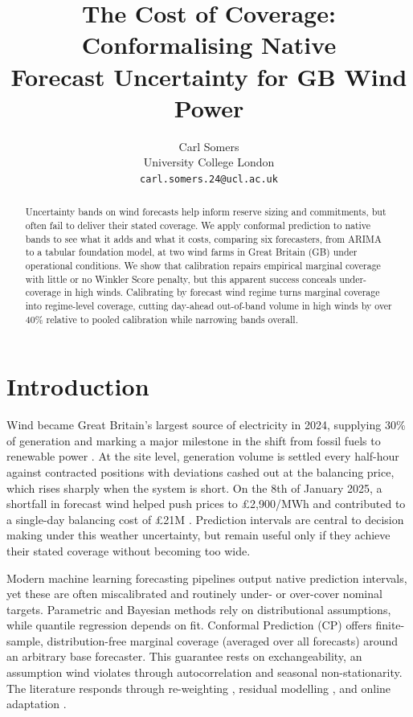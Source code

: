 \documentclass{article}
\title{The Cost of Coverage: Conformalising Native\\Forecast Uncertainty for GB Wind Power}
\author{Carl Somers \\ University College London \\ \texttt{carl.somers.24@ucl.ac.uk}}
\begin{document}
\maketitle

\begin{abstract}
Uncertainty bands on wind forecasts help inform reserve sizing and commitments, but often fail to deliver their stated coverage. We apply conformal prediction to native bands to see what it adds and what it costs, comparing six forecasters, from ARIMA to a tabular foundation model, at two wind farms in Great Britain (GB) under operational conditions. We show that calibration repairs empirical marginal coverage with little or no Winkler Score penalty, but this apparent success conceals under-coverage in high winds. Calibrating by forecast wind regime turns marginal coverage into regime-level coverage, cutting day-ahead out-of-band volume in high winds by over 40\% relative to pooled calibration while narrowing bands overall.
\end{abstract}


\section{Introduction}

Wind became Great Britain’s largest source of electricity in 2024, supplying 30\% of generation and marking a major milestone in the shift from fossil fuels to renewable power \citep{neso_2024_review}. At the site level, generation volume is settled every half-hour against contracted positions with deviations cashed out at the balancing price, which rises sharply when the system is short. On the 8th of January 2025, a shortfall in forecast wind helped push prices to \pounds2,900/MWh and contributed to a single-day balancing cost of \pounds21M \citep{neso_margins_8jan}. Prediction intervals are central to decision making under this weather uncertainty, but remain useful only if they achieve their stated coverage without becoming too wide.

Modern machine learning forecasting pipelines output native prediction intervals, yet these are often miscalibrated and routinely under- or over-cover nominal targets. Parametric and Bayesian methods rely on distributional assumptions, while quantile regression depends on fit. Conformal Prediction (CP) \citep{vovk2005algorithmic} offers finite-sample, distribution-free marginal coverage (averaged over all forecasts) around an arbitrary base forecaster. This guarantee rests on exchangeability, an assumption wind violates through autocorrelation and seasonal non-stationarity. The literature responds through re-weighting \citep{barber2023conformal}, residual modelling \citep{xu2023conformal}, and online adaptation \citep{gibbs2021adaptive}.
\end{document}
